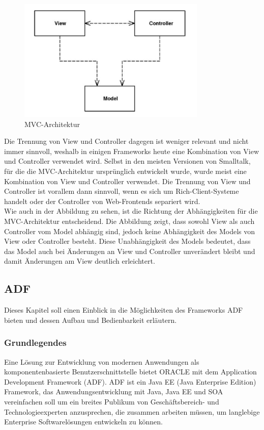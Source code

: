 \begin{figure}[h]
\centering
\includegraphics[width=0.80\textwidth]{img/MVC-Allgemein(Fowler).png}
\caption {MVC-Architektur}
\end{figure}
Die Trennung von View und Controller dagegen ist weniger relevant und nicht immer sinnvoll, weshalb in einigen Frameworks heute eine Kombination von View und Controller verwendet wird. Selbst in den meisten Versionen von Smalltalk, für die die MVC-Architektur ursprünglich entwickelt wurde, wurde meist eine Kombination von View und Controller verwendet. Die Trennung von View und Controller ist vorallem dann sinnvoll, wenn es sich um Rich-Client-Systeme handelt oder der Controller von Web-Frontends separiert wird\citep[S. 321ff Kapitel 14]{PEAA2002}.\\
Wie auch in der Abbildung zu sehen, ist die Richtung der Abhängigkeiten für die MVC-Architektur entscheidend. Die Abbildung zeigt, dass sowohl View als auch Controller vom Model abhängig sind, jedoch keine Abhängigkeit des Models von View oder Controller besteht. Diese Unabhängigkeit des Models bedeutet, dass das Model auch bei Änderungen an View und Controller unverändert bleibt und damit Änderungen am View deutlich erleichtert\citep[S. 321ff Kapitel 14]{PEAA2002}.
\subsection{ADF}
Dieses Kapitel soll einen Einblick in die Möglichkeiten des Frameworks ADF bieten und dessen Aufbau und Bedienbarkeit erläutern.

\subsubsection{Grundlegendes}

Eine Lösung zur Entwicklung von modernen Anwendungen als komponentenbasierte Benutzerschnittstelle bietet ORACLE mit dem Application Development Framework (ADF). ADF ist ein Java EE (Java Enterprise Edition) Framework, das Anwendungsentwicklung mit Java, Java EE und SOA vereinfachen soll um ein breites Publikum von Geschäftsbereich- und Technologieexperten anzusprechen, die zusammen arbeiten müssen, um langlebige Enterprise Softwarelösungen entwickeln zu können\citep[S. XXIII Kapitel: Introduction]{OFDG2010}.
